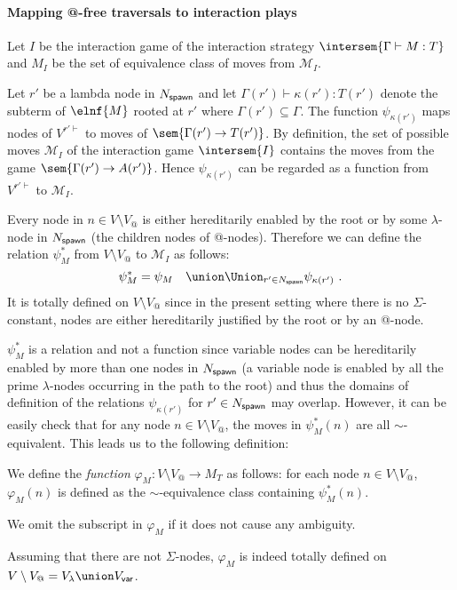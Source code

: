 \paragraph{Mapping @-free traversals to interaction plays}
    Let $I$ be the interaction game of the interaction strategy $\intersem{\Gamma \vdash M : T}$ and
    $M_I$ be the set of equivalence class of moves from $\mathcal{M}_I$.

    Let $r'$ be a lambda node in $N_{\sf spawn}$ and let $\Gamma(r') \vdash \kappa(r') : T(r')$ denote the subterm of $\elnf{M}$ rooted at $r'$ where $\Gamma(r')\subseteq \Gamma$.
    The function $\psi_{\kappa(r')}$ maps nodes of $V^{r'\vdash}$
    to moves of $\sem{\Gamma(r') \rightarrow T(r')}$. By definition,
    the set of possible moves $\mathcal{M}_I$ of the interaction game $\intersem{I}$ contains the
    moves from the game $\sem{\Gamma(r') \rightarrow A(r')}$. Hence $\psi_{\kappa(r')}$ can be regarded as a function from $V^{r'\vdash}$ to $\mathcal{M}_I$.

    Every node in $n \in V\setminus V_@$ is either hereditarily enabled by the root or by some $\lambda$-node in $N_{\sf spawn}$ (the children nodes of @-nodes). Therefore we can define the relation $\psi^*_M$ from
    $V\setminus V_@$ to $\mathcal{M}_I$ as follows:
    $$ \psi^*_M = \psi_{M} \quad \union \Union_{r' \in N_{\sf spawn}} \psi_{\kappa(r')} \ .$$
    It is totally defined on $V\setminus V_@$ since in the present setting where there is no $\Sigma$-constant, nodes are either hereditarily justified by the root or by an @-node.

    $\psi^*_M$ is a relation and not a function since variable nodes can be hereditarily enabled by more than one nodes in $N_{\sf spawn}$  (a variable node is enabled by all the prime $\lambda$-nodes occurring in the path to the root) and thus the domains of definition of the relations $\psi_{\kappa(r')}$ for $r' \in N_{\sf spawn}$ may overlap.  However, it can be easily check that for any node $n \in V\setminus V_@$,
    the moves in $\psi^*_M (n)$ are all $\sim$-equivalent. This leads us to the following definition:

    \begin{definition}
        \label{def:phi mapping}
        We define the \emph{function}
        $\varphi_M:V\setminus V_@ \rightarrow M_T$ as follows: for each node $n \in V\setminus V_@$,
        $\varphi_M(n)$ is defined as the $\sim$-equivalence class containing $\psi^*_M (n)$.

        We omit the subscript in $\varphi_M$ if it does not cause any ambiguity.
    \end{definition}
    Assuming that there are not $\Sigma$-nodes, $\varphi_M$ is indeed totally defined on $V \setminus V_@ = V_\lambda \union V_{\sf var}$.

